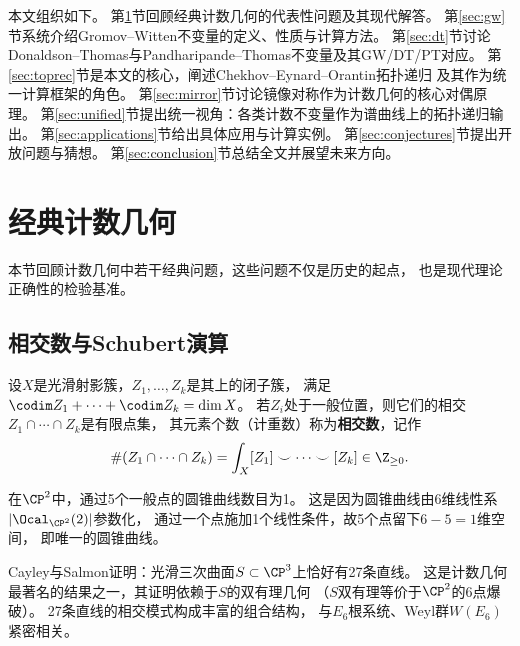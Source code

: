 本文组织如下。
第\ref{sec:classical}节回顾经典计数几何的代表性问题及其现代解答。
第\ref{sec:gw}节系统介绍Gromov--Witten不变量的定义、性质与计算方法。
第\ref{sec:dt}节讨论Donaldson--Thomas与Pandharipande--Thomas不变量及其GW/DT/PT对应。
第\ref{sec:toprec}节是本文的核心，阐述Chekhov--Eynard--Orantin拓扑递归
及其作为统一计算框架的角色。
第\ref{sec:mirror}节讨论镜像对称作为计数几何的核心对偶原理。
第\ref{sec:unified}节提出统一视角：各类计数不变量作为谱曲线上的拓扑递归输出。
第\ref{sec:applications}节给出具体应用与计算实例。
第\ref{sec:conjectures}节提出开放问题与猜想。
第\ref{sec:conclusion}节总结全文并展望未来方向。


\section{经典计数几何}\label{sec:classical}

本节回顾计数几何中若干经典问题，这些问题不仅是历史的起点，
也是现代理论正确性的检验基准。

\subsection{相交数与Schubert演算}

\begin{definition}[相交数]\label{def:intersect}
设$X$是光滑射影簇，$Z_1, \ldots, Z_k$是其上的闭子簇，
满足$\codim Z_1 + \cdots + \codim Z_k = \dim X$。
若$Z_i$处于一般位置，则它们的相交$Z_1 \cap \cdots \cap Z_k$是有限点集，
其元素个数（计重数）称为\textbf{相交数}，记作
\[
\#(Z_1 \cap \cdots \cap Z_k) = \int_X [Z_1] \smile \cdots \smile [Z_k] \in \Z_{\geq 0}.
\]
\end{definition}

\begin{example}[通过5个点的圆锥曲线]\label{ex:5conics}
在$\CP^2$中，通过5个一般点的圆锥曲线数目为1。
这是因为圆锥曲线由6维线性系$|\Ocal_{\CP^2}(2)|$参数化，
通过一个点施加1个线性条件，故5个点留下$6-5=1$维空间，
即唯一的圆锥曲线。
\end{example}

\begin{example}\label{ex:27lines}
Cayley与Salmon证明：光滑三次曲面$S \subset \CP^3$上恰好有27条直线。
这是计数几何最著名的结果之一，其证明依赖于$S$的双有理几何
（$S$双有理等价于$\CP^2$的6点爆破）。
27条直线的相交模式构成丰富的组合结构，
与$E_6$根系统、Weyl群$W(E_6)$紧密相关。
\end{example}


